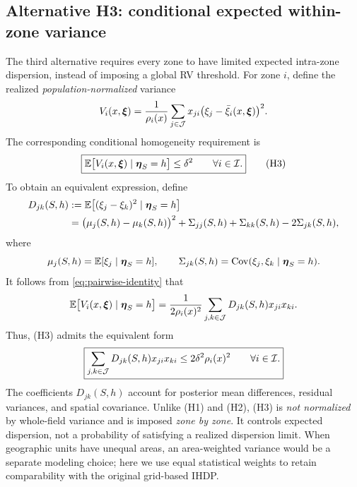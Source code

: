 \subsection{Alternative H3: conditional expected within-zone variance}
\label{subsec:homogeneity-h3}

The third alternative requires every zone to have limited expected
intra-zone dispersion, instead of imposing a global RV threshold. For
zone $i$, define the realized \emph{population-normalized} variance
\begin{equation}
 V_i(x,\boldsymbol\xi)
 =\frac1{\rho_i(x)}\sum_{j\in\mathcal{J}}
  x_{ji}\bigl(\xi_j-\bar\xi_i(x,\boldsymbol\xi)\bigr)^2.
 \label{eq:within-zone-var}
\end{equation}
The corresponding conditional homogeneity requirement is
\begin{equation}
 \boxed{\displaystyle
 \mathbb{E}\bigl[V_i(x,\boldsymbol\xi)
       \mid\boldsymbol\eta_S=h\bigr]\leq\delta^2
       \qquad\forall i\in\mathcal{I}.}
 \tag{H3}\label{eq:H3}
\end{equation}
To obtain an equivalent expression, define
\begin{equation}
\begin{aligned}
 D_{jk}(S,h)
 &:=\mathbb{E}\bigl[(\xi_j-\xi_k)^2
           \mid\boldsymbol\eta_S=h\bigr]\\
 &=\bigl(\mu_j(S,h)-\mu_k(S,h)\bigr)^2
    +\Sigma_{jj}(S,h)+\Sigma_{kk}(S,h)
    -2\Sigma_{jk}(S,h),
\end{aligned}
\label{eq:posterior-diff}
\end{equation}
where
\begin{equation}
 \mu_j(S,h)=\mathbb{E}[\xi_j\mid\boldsymbol\eta_S=h],\qquad
 \Sigma_{jk}(S,h)=\operatorname{Cov}(\xi_j,\xi_k\mid\boldsymbol\eta_S=h).
 \label{eq:posterior-moments}
\end{equation}
It follows from \eqref{eq:pairwise-identity} that
\begin{equation}
 \mathbb{E}\bigl[V_i(x,\boldsymbol\xi)\mid\boldsymbol\eta_S=h\bigr]
 =\frac{1}{2\rho_i(x)^2}
    \sum_{j,k\in\mathcal{J}}D_{jk}(S,h)x_{ji}x_{ki}.
 \label{eq:conditional-zone-var}
\end{equation}
Thus, (H3) admits the equivalent form
\begin{equation}
 \boxed{\displaystyle
 \sum_{j,k\in\mathcal{J}}D_{jk}(S,h)x_{ji}x_{ki}
 \leq2\delta^2\rho_i(x)^2
 \qquad\forall i\in\mathcal{I}.}
 \label{eq:H3-pairwise}
\end{equation}
The coefficients $D_{jk}(S,h)$ account for posterior mean differences,
residual variances, and spatial covariance. Unlike (H1) and (H2), (H3)
is \emph{not normalized} by whole-field variance and is imposed
\emph{zone by zone}. It controls expected dispersion, not a probability
of satisfying a realized dispersion limit. When geographic units have
unequal areas, an area-weighted variance would be a separate modeling
choice; here we use equal statistical weights to retain comparability
with the original grid-based IHDP.

